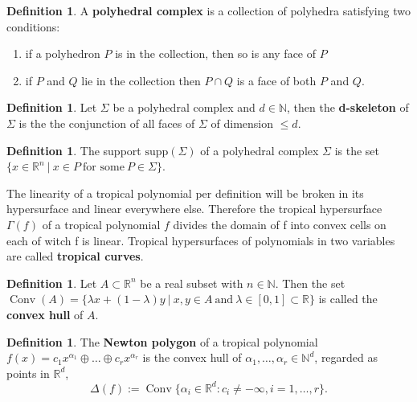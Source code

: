\documentclass{article}
\theoremstyle{definition}
\newtheorem{definition}[theorem]{Definition}
\DeclareMathOperator{\Conv}{Conv}
\begin{document}
\begin{definition}\cite{maclagan2015introduction}
A \textbf{polyhedral complex} is a collection of polyhedra satisfying two conditions:
\begin{enumerate}[i]
\item if a polyhedron $P$ is in the collection, then so is any face of $P$
\item if $P$ and $Q$ lie in the collection then $P \cap Q$ is a face of both $P$ and $Q$.
\end{enumerate}
\end{definition}
\begin{definition}
Let $\Sigma$ be a polyhedral complex and $d \in \mathbb{N}$, then the \textbf{d-skeleton} of $\Sigma$ is the the conjunction of all faces of $\Sigma$ of dimension $\leq d$.
\end{definition}
\begin{definition}\cite{maclagan2015introduction}
The support $\text{supp}(\Sigma)$ of a polyhedral complex $\Sigma$ is the set $\{ x \in \mathbb{R}^{n} \ | \ x \in P \ \text{for some} \ P \in \Sigma \}.$
\end{definition}


The linearity of a tropical polynomial per definition will be broken in its hypersurface and linear everywhere else. Therefore the tropical hypersurface $\Gamma(f)$ of a tropical polynomial $f$ divides the domain of f into convex cells on each of witch f is linear. Tropical hypersurfaces of polynomials in two variables are called \textbf{tropical curves}.\cite[p.~3]{zhang2018tropical}

\begin{definition}
Let $A \subset \mathbb{R}^{n}$ be a real subset with $n \in \mathbb{N}$. Then the set $\Conv(A) = \{\lambda x + (1- \lambda)y \ | \ x, y \in A \ \text{and} \ \lambda \in [0,1] \subset \mathbb{R}\}$ is called the \textbf{convex hull} of $A$.
\end{definition}

\begin{definition}\cite[p.~3]{zhang2018tropical}
The \textbf{Newton polygon} of a tropical polynomial $f(x) = c_1 x^{\alpha_1} \oplus \dots \oplus c_r x^{\alpha_r}$  is the convex hull of $\alpha_1 , \dots , \alpha_r \in \mathbb{N}^{d}$, regarded as points in $\mathbb{R}^{d}$,
$$ \Delta(f) := \Conv\{\alpha_i \in \mathbb{R}^{d} : c_i \neq -\infty , i = 1, \dots ,r \}. $$
\end{definition}
\end{document}
